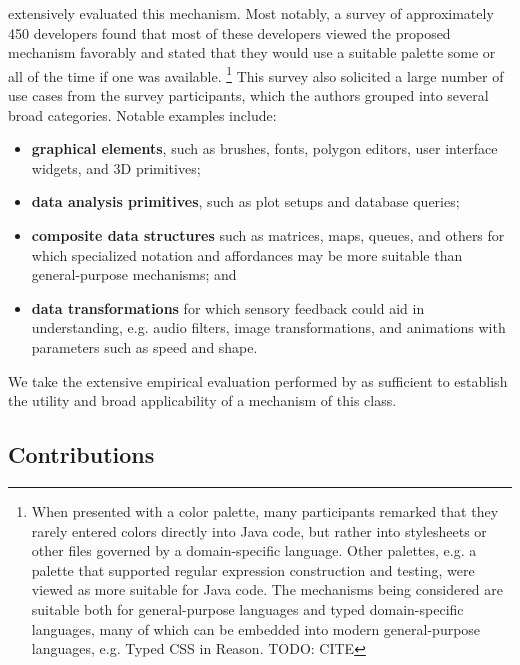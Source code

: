 \citet{Graphite} extensively evaluated this mechanism. 
Most notably, a survey of approximately 450 developers found that 
most of these developers viewed the proposed mechanism favorably and stated that they 
would use a suitable palette some or all of the time if one was available.%
\footnote{When presented with a color palette, 
many participants remarked that they rarely entered colors directly into Java code, 
but rather into stylesheets or other files governed by a domain-specific language. 
Other palettes, e.g. a palette
that supported regular expression construction and testing, were viewed as more 
suitable for Java code. 
The mechanisms being considered are suitable both for general-purpose languages
and typed domain-specific languages, many of which can be embedded into modern 
general-purpose languages, e.g. Typed CSS in Reason. TODO: CITE} 
This survey also solicited a large number of use cases from the survey participants, 
which the authors grouped into several broad categories. Notable examples include:
\begin{itemize}
  \item \textbf{graphical elements}, such as brushes, fonts, polygon editors, user interface widgets, and 3D primitives;
  \item \textbf{data analysis primitives}, such as plot setups and database queries; 
  \item \textbf{composite data structures} such as matrices, maps, queues, and others for which specialized notation and affordances may be more suitable than general-purpose mechanisms; and
  \item \textbf{data transformations} for which sensory feedback could aid in understanding, 
  e.g. audio filters, image transformations, and animations with parameters such as speed and shape.
\end{itemize}

We take the extensive empirical evaluation performed by \citet{Graphite} as sufficient to establish 
the utility and broad applicability of a mechanism of this class. 

\subsection{Contributions}

